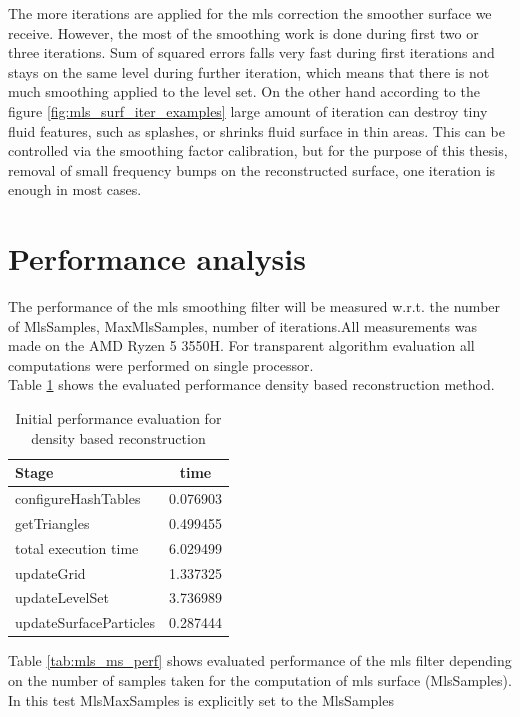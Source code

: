 The more iterations are applied for the mls correction the smoother surface we receive. However, the most of the smoothing work is done during first two or three iterations. Sum of squared errors falls very fast during first iterations and stays on the same level during further iteration, which means that there is not much smoothing applied to the level set. On the other hand according to the figure \ref{fig:mls_surf_iter_examples} large amount of iteration can destroy tiny fluid features, such as splashes, or shrinks fluid surface in thin areas. This can be controlled via the smoothing factor calibration, but for the purpose of this thesis, removal of small frequency bumps on the reconstructed surface, one iteration is enough in most cases.

\section{Performance analysis}
The performance of the mls smoothing filter will be measured w.r.t. the number of MlsSamples, MaxMlsSamples, number of iterations.All measurements was made on the AMD Ryzen 5 3550H. For transparent algorithm evaluation all computations were performed on single processor.\\
Table \ref{tab:mls_initial_method} shows the evaluated performance density based reconstruction method.
\begin{table}[H]
	\begin{center}
		\scriptsize
		\begin{tabular}{|l|c|}
			\hline
			Stage & time \\
			\hline
				configureHashTables	&	0.076903\\
				getTriangles	&	0.499455\\
				total execution time	&	6.029499\\
				updateGrid	&	1.337325\\
				updateLevelSet	&	3.736989\\
				updateSurfaceParticles	&	0.287444\\
			\hline
		\end{tabular}
	\end{center}
	\caption{Initial performance evaluation for density based reconstruction}
	\label{tab:mls_initial_method}
\end{table}
Table \ref{tab:mls_ms_perf} shows evaluated performance of the mls filter depending on the number of samples taken for the computation of mls surface (MlsSamples). In this test MlsMaxSamples is explicitly set to the MlsSamples
